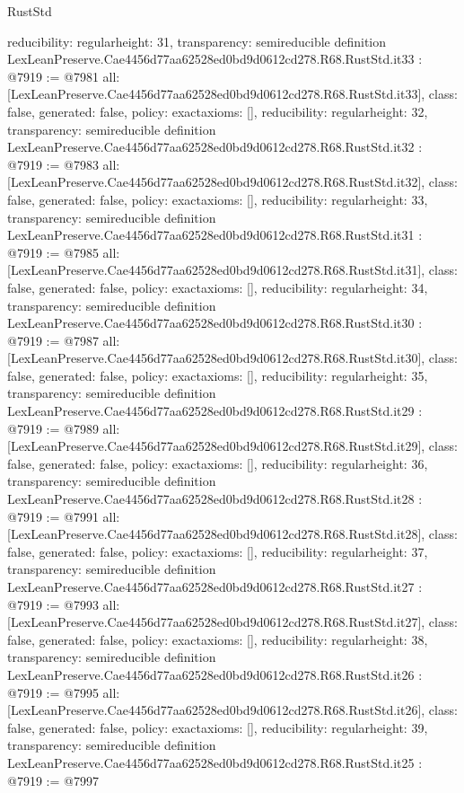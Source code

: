 \begin{lexlean}{RustStd}
\begin{coremodule}
{  reducibility: regular{height: 31},
  transparency: semireducible
}
definition LexLeanPreserve.Cae4456d77aa62528ed0bd9d0612cd278.R68.RustStd.it33 : @7919 := @7981 {
  all: [LexLeanPreserve.Cae4456d77aa62528ed0bd9d0612cd278.R68.RustStd.it33],
  class: false,
  generated: false,
  policy: exact{axioms: []},
  reducibility: regular{height: 32},
  transparency: semireducible
}
definition LexLeanPreserve.Cae4456d77aa62528ed0bd9d0612cd278.R68.RustStd.it32 : @7919 := @7983 {
  all: [LexLeanPreserve.Cae4456d77aa62528ed0bd9d0612cd278.R68.RustStd.it32],
  class: false,
  generated: false,
  policy: exact{axioms: []},
  reducibility: regular{height: 33},
  transparency: semireducible
}
definition LexLeanPreserve.Cae4456d77aa62528ed0bd9d0612cd278.R68.RustStd.it31 : @7919 := @7985 {
  all: [LexLeanPreserve.Cae4456d77aa62528ed0bd9d0612cd278.R68.RustStd.it31],
  class: false,
  generated: false,
  policy: exact{axioms: []},
  reducibility: regular{height: 34},
  transparency: semireducible
}
definition LexLeanPreserve.Cae4456d77aa62528ed0bd9d0612cd278.R68.RustStd.it30 : @7919 := @7987 {
  all: [LexLeanPreserve.Cae4456d77aa62528ed0bd9d0612cd278.R68.RustStd.it30],
  class: false,
  generated: false,
  policy: exact{axioms: []},
  reducibility: regular{height: 35},
  transparency: semireducible
}
definition LexLeanPreserve.Cae4456d77aa62528ed0bd9d0612cd278.R68.RustStd.it29 : @7919 := @7989 {
  all: [LexLeanPreserve.Cae4456d77aa62528ed0bd9d0612cd278.R68.RustStd.it29],
  class: false,
  generated: false,
  policy: exact{axioms: []},
  reducibility: regular{height: 36},
  transparency: semireducible
}
definition LexLeanPreserve.Cae4456d77aa62528ed0bd9d0612cd278.R68.RustStd.it28 : @7919 := @7991 {
  all: [LexLeanPreserve.Cae4456d77aa62528ed0bd9d0612cd278.R68.RustStd.it28],
  class: false,
  generated: false,
  policy: exact{axioms: []},
  reducibility: regular{height: 37},
  transparency: semireducible
}
definition LexLeanPreserve.Cae4456d77aa62528ed0bd9d0612cd278.R68.RustStd.it27 : @7919 := @7993 {
  all: [LexLeanPreserve.Cae4456d77aa62528ed0bd9d0612cd278.R68.RustStd.it27],
  class: false,
  generated: false,
  policy: exact{axioms: []},
  reducibility: regular{height: 38},
  transparency: semireducible
}
definition LexLeanPreserve.Cae4456d77aa62528ed0bd9d0612cd278.R68.RustStd.it26 : @7919 := @7995 {
  all: [LexLeanPreserve.Cae4456d77aa62528ed0bd9d0612cd278.R68.RustStd.it26],
  class: false,
  generated: false,
  policy: exact{axioms: []},
  reducibility: regular{height: 39},
  transparency: semireducible
}
definition LexLeanPreserve.Cae4456d77aa62528ed0bd9d0612cd278.R68.RustStd.it25 : @7919 := @7997 {
}
\end{coremodule}
\end{lexlean}
